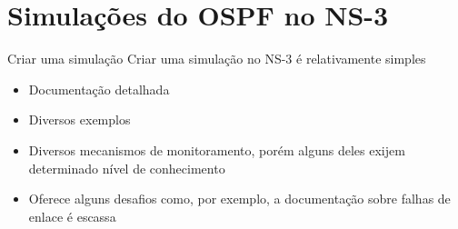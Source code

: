 \documentclass{beamer}
\newlength{\wideitemsep}
\let\olditem\item
\renewcommand{\item}{\setlength{\itemsep}{\wideitemsep}\olditem}
\begin{document}

\section{Simulações do OSPF no NS-3} %
\begin{frame}{Criar uma simulação}
Criar uma simulação no NS-3 é relativamente simples
\begin{itemize}
 \item Documentação detalhada %
 \item Diversos exemplos %
 \item Diversos mecanismos de monitoramento, porém alguns deles exijem determinado nível de conhecimento %
 \item Oferece alguns desafios como, por exemplo, a documentação sobre falhas de enlace é escassa %
\end{itemize}
\end{frame}
\end{document}

